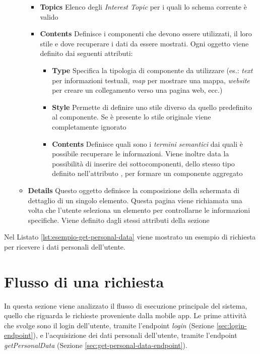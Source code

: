 \begin{itemize}
\begin{itemize}
		\begin{itemize}
			\item \textbf{Topics} Elenco degli \emph{Interest Topic} per i quali lo schema corrente è valido
			\item \textbf{Contents} Definisce i componenti che devono essere utilizzati, il loro stile e dove recuperare i dati da essere mostrati. Ogni oggetto viene definito dai seguenti attributi:
			\begin{itemize}
				\item \textbf{Type} Specifica la tipologia di componente da utilizzare (es.: \emph{text} per informazioni testuali, \emph{map} per mostrare una mappa, \emph{website} per creare un collegamento verso una pagina web, ecc.)
				\item \textbf{Style} Permette di definire uno stile diverso da quello predefinito al componente. Se è presente lo stile originale viene completamente ignorato
				\item \textbf{Contents} Definisce quali sono i \emph{termini semantici} dai quali è possibile recuperare le informazioni. Viene inoltre data la possibilità di inserire dei sottocomponenti, dello stesso tipo definito nell'attributo , per formare un componente aggregato
			\end{itemize}
		\end{itemize}	
		\item \textbf{Details} Questo oggetto definisce la composizione della schermata di dettaglio di un singolo elemento. Questa pagina viene richiamata una volta che l'utente seleziona un elemento per controllarne le informazioni specifiche. Viene definito dagli stessi attributi della sezione 			
	\end{itemize}
\end{itemize}

Nel Listato \ref{lst:esempio-get-personal-data} viene mostrato un esempio di richiesta per ricevere i dati personali dell'utente.



\section{Flusso di una richiesta\label{sec:flusso-richiesta-server}}

In questa sezione viene analizzato il flusso di esecuzione principale del sistema, quello che riguarda le richieste proveniente dalla mobile app. Le prime attività che svolge sono il login dell'utente, tramite l'endpoint \emph{login} (Sezione \ref{sec:login-endpoint}), e l'acquisizione dei dati personali dell'utente, tramite l'endpoint \emph{getPersonalData} (Sezione \ref{sec:get-personal-data-endpoint}).

